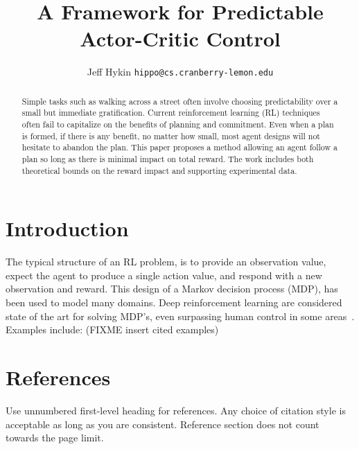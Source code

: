 \documentclass{article}
\title{A Framework for Predictable Actor-Critic Control}
\author{%
    Jeff Hykin
    \texttt{hippo@cs.cranberry-lemon.edu} \\
}
\begin{document}
    \maketitle
    \begin{abstract}
        Simple tasks such as walking across a street often involve choosing predictability over a small but immediate gratification. Current reinforcement learning (RL) techniques often fail to capitalize on the benefits of planning and commitment. Even when a plan is formed, if there is any benefit, no matter how small, most agent designs will not hesitate to abandon the plan. This paper proposes a method allowing an agent follow a plan so long as there is minimal impact on total reward. The work includes both theoretical bounds on the reward impact and supporting experimental data.
    \end{abstract}

    \section{Introduction}
    
        The typical structure of an RL problem, is to provide an observation value, expect the agent to produce a single action value, and respond with a new observation and reward. This design of a Markov decision process (MDP), has been used to model many domains. Deep reinforcement learning are considered state of the art for solving MDP's, even surpassing human control in some areas~\cite{haarnoja2018soft,schulman2017proximal,mnih2015human}. Examples include: (FIXME insert cited examples)


            


    \section*{References}
        Use unnumbered first-level heading for references.
        Any choice of citation style is acceptable as long as you are consistent.
        Reference section does not count towards the page limit.
    \medskip
    
\end{document}
